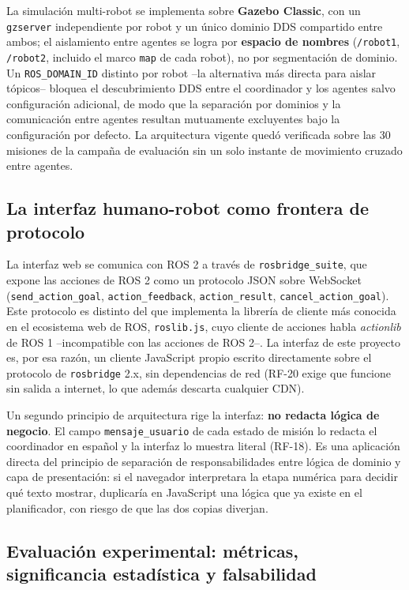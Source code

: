 \documentclass[12pt,letterpaper]{article}
\begin{document}
La simulación multi-robot se implementa sobre \textbf{Gazebo Classic}, con un \texttt{gzserver} independiente por robot y un único dominio DDS compartido entre ambos; el aislamiento entre agentes se logra por \textbf{espacio de nombres} (\texttt{/robot1}, \texttt{/robot2}, incluido el marco \texttt{map} de cada robot), no por segmentación de dominio. Un \texttt{ROS\_DOMAIN\_ID} distinto por robot --la alternativa más directa para aislar tópicos-- bloquea el descubrimiento DDS entre el coordinador y los agentes salvo configuración adicional, de modo que la separación por dominios y la comunicación entre agentes resultan mutuamente excluyentes bajo la configuración por defecto. La arquitectura vigente quedó verificada sobre las 30 misiones de la campaña de evaluación sin un solo instante de movimiento cruzado entre agentes.

\subsection{La interfaz humano-robot como frontera de protocolo}

La interfaz web se comunica con ROS 2 a través de \texttt{rosbridge\_suite}, que expone las acciones de ROS 2 como un protocolo JSON sobre WebSocket (\texttt{send\_action\_goal}, \texttt{action\_feedback}, \texttt{action\_result}, \texttt{cancel\_action\_goal}). Este protocolo es distinto del que implementa la librería de cliente más conocida en el ecosistema web de ROS, \texttt{roslib.js}, cuyo cliente de acciones habla \textit{actionlib} de ROS 1 --incompatible con las acciones de ROS 2--. La interfaz de este proyecto es, por esa razón, un cliente JavaScript propio escrito directamente sobre el protocolo de \texttt{rosbridge} 2.x, sin dependencias de red (RF-20 exige que funcione sin salida a internet, lo que además descarta cualquier CDN).

Un segundo principio de arquitectura rige la interfaz: \textbf{no redacta lógica de negocio}. El campo \texttt{mensaje\_usuario} de cada estado de misión lo redacta el coordinador en español y la interfaz lo muestra literal (RF-18). Es una aplicación directa del principio de separación de responsabilidades entre lógica de dominio y capa de presentación: si el navegador interpretara la etapa numérica para decidir qué texto mostrar, duplicaría en JavaScript una lógica que ya existe en el planificador, con riesgo de que las dos copias diverjan.

\subsection{Evaluación experimental: métricas, significancia estadística y falsabilidad}
\end{document}
